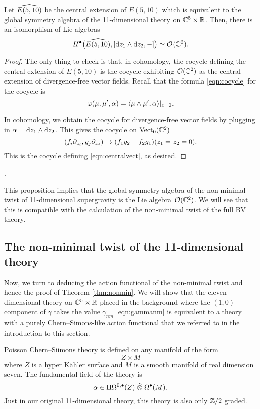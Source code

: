 \begin{prop}
Let $\Hat{E(5,10)}$ be the central extension of $E(5,10)$ which is equivalent to the global symmetry algebra of the 11-dimensional theory on $\CC^5 \times \RR$. 
Then, there is an isomorphism of Lie algebras 
\[
H^\bu \big(\Hat{E(5,10)} , [\d z_1 \wedge \d z_2, -] \big) \simeq \cO(\CC^2) .
\]
\end{prop}
\begin{proof}
The only thing to check is that, in cohomology, the cocycle defining the central extension of $E(5,10)$ is the cocycle exhibiting $\cO(\CC^2)$ as the central extension of divergence-free vector fields. 
Recall that the formula \eqref{eqn:cocycle} for the cocycle is 
\[
\varphi(\mu, \mu', \alpha) = \<\mu \wedge \mu', \alpha\>|_{z=0}.
\]

In cohomology, we obtain the cocycle for divergence-free vector fields by plugging in $\alpha = \d z_1 \wedge \d z_2$. 
This gives the cocycle on $\Vect_0(\CC^2)$ 
\[
(f_i \del_{z_i}, g_j \del_{z_j}) \mapsto (f_1 g_2 - f_2 g_1)(z_1=z_2=0) .
\]
This is the cocycle defining \eqref{eqn:centralvect}, as desired. 
\end{proof}.

This proposition implies that the global symmetry algebra of the non-minimal twist of 11-dimensional supergravity is the Lie algebra $\cO(\CC^2)$. 
We will see that this is compatible with the calculation of the non-minimal twist of the full BV theory. 

\subsection{The non-minimal twist of the 11-dimensional theory}

Now, we turn to deducing the action functional of the non-minimal twist and hence the proof of Theorem \ref{thm:nonmin}. 
We will show that the eleven-dimensional theory on $\CC^5 \times \RR$ placed in the background where the $(1,0)$ component of $\gamma$ takes the value $\gamma_{nm}$ \eqref{eqn:gammanm} is equivalent to a theory with a purely Chern--Simons-like action functional that we referred to in the introduction to this section. 

Poisson Chern--Siimons theory is defined on any manifold of the form
\[
Z \times M
\]
where $Z$ is a hyper K\"ahler surface and $M$ is a smooth manifold of real dimension seven. 
The fundamental field of the theory is  
\[
\alpha \in \Pi \Omega^{0,\bu}(Z) \; \Hat{\otimes} \; \Omega^\bu(M)  .
\]
Just in our original 11-dimensional theory, this theory is also only $\ZZ/2$ graded. 

